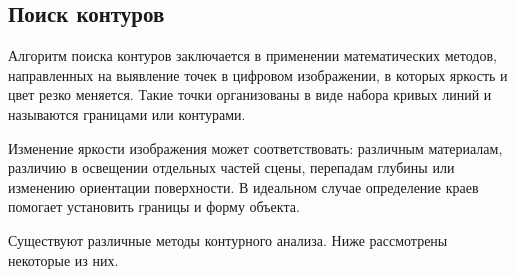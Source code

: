 \subsection{Поиск контуров}
Алгоритм поиска контуров заключается в применении математических методов, направленных на выявление точек в цифровом изображении, в которых яркость и цвет резко меняется. Такие точки организованы в виде набора кривых линий и называются границами или контурами.

Изменение яркости изображения может соответствовать: различным материалам, различию в освещении отдельных частей сцены, перепадам глубины или изменению ориентации поверхности. В идеальном случае определение краев помогает установить границы и форму объекта.

Существуют различные методы контурного анализа. Ниже рассмотрены некоторые из них.
